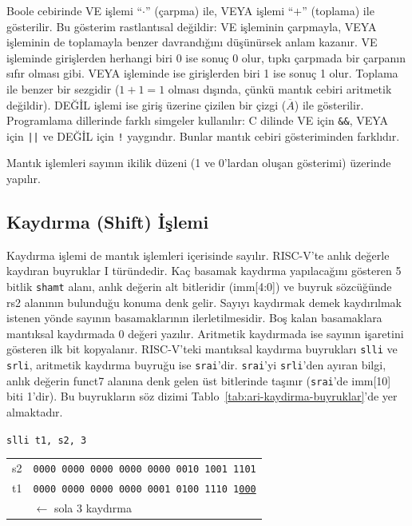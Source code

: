 Boole cebirinde VE işlemi ``$\cdot$'' (çarpma) ile, VEYA işlemi ``$+$'' (toplama) ile gösterilir. Bu gösterim rastlantısal değildir: VE işleminin çarpmayla, VEYA işleminin de toplamayla benzer davrandığını düşünürsek anlam kazanır. VE işleminde girişlerden herhangi biri 0 ise sonuç 0 olur, tıpkı çarpmada bir çarpanın sıfır olması gibi. VEYA işleminde ise girişlerden biri 1 ise sonuç 1 olur. Toplama ile benzer bir sezgidir ($1 + 1 = 1$ olması dışında, çünkü mantık cebiri aritmetik değildir). DEĞİL işlemi ise giriş üzerine çizilen bir çizgi ($\overline{A}$) ile gösterilir. Programlama dillerinde farklı simgeler kullanılır: C dilinde VE için \texttt{\&\&}, VEYA için \texttt{||} ve DEĞİL için \texttt{!} yaygındır. Bunlar mantık cebiri gösteriminden farklıdır.

Mantık işlemleri sayının ikilik düzeni (1 ve 0'lardan oluşan gösterimi) üzerinde yapılır.

\subsection{Kaydırma (Shift) İşlemi}

Kaydırma işlemi de mantık işlemleri içerisinde sayılır. RISC-V'te anlık değerle kaydıran buyruklar I türündedir. Kaç basamak kaydırma yapılacağını gösteren 5 bitlik \texttt{shamt} alanı, anlık değerin alt bitleridir (imm[4:0]) ve buyruk sözcüğünde rs2 alanının bulunduğu konuma denk gelir. Sayıyı kaydırmak demek kaydırılmak istenen yönde sayının basamaklarının ilerletilmesidir. Boş kalan basamaklara mantıksal kaydırmada 0 değeri yazılır. Aritmetik kaydırmada ise sayının işaretini gösteren ilk bit kopyalanır. RISC-V'teki mantıksal kaydırma buyrukları \texttt{slli} ve \texttt{srli}, aritmetik kaydırma buyruğu ise \texttt{srai}'dir. \texttt{srai}'yi \texttt{srli}'den ayıran bilgi, anlık değerin funct7 alanına denk gelen üst bitlerinde taşınır (\texttt{srai}'de imm[10] biti 1'dir). Bu buyrukların söz dizimi Tablo~\ref{tab:ari-kaydirma-buyruklar}'de yer almaktadır.

\begin{center}\texttt{slli t1, s2, 3} \end{center}\vspace{-6pt}
\begin{center}
\small
\begin{tabular}{r@{\;\;}l}
  s2 & \texttt{0000\,0000\,0000\,0000\,0000\,0010\,1001\,1101} \\
  t1 & \texttt{0000\,0000\,0000\,0000\,0001\,0100\,1110\,1\underline{000}} \\
  & \hfill$\longleftarrow$ \textnormal{sola 3 kaydırma} \\
\end{tabular}
\end{center}

